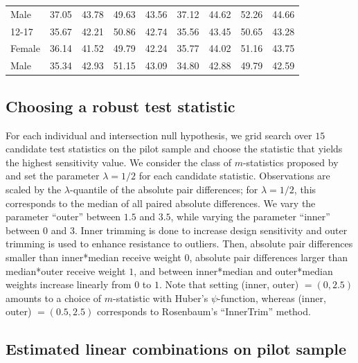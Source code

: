 \documentclass[12pt,leqno,titlepage]{amsart}
\newcommand{\1}{\mathbbm{1}}
\begin{document}
\begin{bibunit}
\begin{longtable}{@{\extracolsep{\fill}}lcccc|cccc@{}}
\hspace*{4.4em}Male & 37.05 & 43.78 & 49.63 & 43.56 & 37.12 & 44.62 & 52.26 & 44.66 \\
\hspace*{2.2em}12-17 & 35.67 & 42.21 & 50.86 & 42.74 & 35.56 & 43.45 & 50.65 & 43.28 \\
\hspace*{4.4em}Female & 36.14 & 41.52 & 49.79 & 42.24 & 35.77 & 44.02 & 51.16 & 43.75 \\
\hspace*{4.4em}Male & 35.34 & 42.93 & 51.15 & 43.09 & 34.80 & 42.88 & 49.79 & 42.59 \\
\end{longtable}
\normalsize





\subsection{Choosing a robust test statistic}
For each individual and intersection null hypothesis, we grid search over $15$ candidate test statistics on the pilot sample and choose the statistic that yields the highest sensitivity value. We consider the class of $m$-statistics proposed by \cite{rosenbaum2007sensitivity, rosenbaum2013impact} and set the parameter $\lambda = 1/2$ for each candidate statistic. Observations are scaled by the $\lambda$-quantile of the absolute pair differences; for  $\lambda = 1/2$, this corresponds to the median of all paired absolute differences. We vary the parameter ``outer'' between $1.5$ and $3.5$, while varying the parameter ``inner'' between $0$ and $3$. Inner trimming is done to increase design sensitivity and outer trimming is used to enhance resistance to outliers. Then, absolute pair differences smaller than inner*median receive weight $0$, absolute pair differences larger than median*outer receive weight $1$, and between inner*median and outer*median weights increase linearly from $0$ to $1$. Note that setting (inner, outer) $= (0, 2.5)$ amounts to a choice of $m$-statistic with Huber’s $\psi$-function, whereas (inner, outer) $= (0.5, 2.5)$ corresponds to Rosenbaum's ``InnerTrim'' method.


\subsection{Estimated linear combinations on pilot sample} \label{appendix:lambda-estimates}


\end{bibunit}
\end{document}
